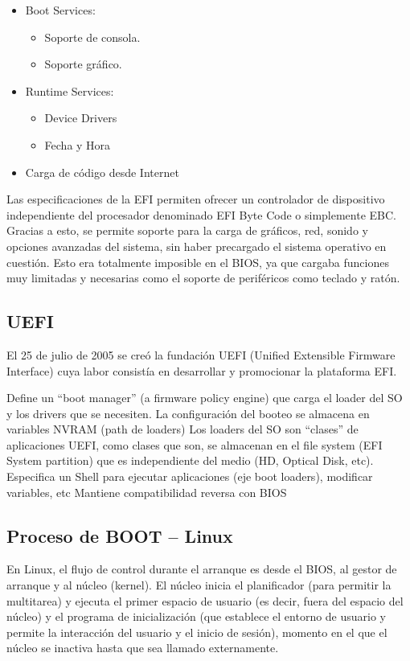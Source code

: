\documentclass[a4paper, twoside]{article}
\begin{document}
\begin{itemize}
	\item Boot Services:
	\begin{itemize}
		\item Soporte de consola.
		\item Soporte gráfico.
	\end{itemize}
	\item Runtime Services:
	\begin{itemize}
		\item Device Drivers
		\item Fecha y Hora
	\end{itemize}
	\item Carga de código desde Internet
\end{itemize}

Las especificaciones de la EFI permiten ofrecer un controlador de dispositivo independiente del procesador denominado EFI Byte Code o simplemente EBC. Gracias a esto, se permite soporte para la carga de gráficos, red, sonido y opciones avanzadas del sistema, sin haber precargado el sistema operativo en cuestión. Esto era totalmente imposible en el BIOS, ya que cargaba funciones muy limitadas y necesarias como el soporte de periféricos como teclado y ratón.

\subsection{UEFI}
El 25 de julio de 2005 se creó la fundación UEFI (Unified Extensible Firmware Interface) cuya labor consistía en desarrollar y promocionar la plataforma EFI.

Define un “boot manager” (a firmware policy engine) que carga el loader del SO y los drivers que se necesiten.
La configuración del booteo se almacena en variables NVRAM (path de loaders)
Los loaders del SO son “clases” de aplicaciones UEFI, como clases que son, se almacenan en el file system (EFI System partition) que es independiente del medio (HD, Optical Disk, etc).
Especifica un Shell para ejecutar aplicaciones (eje boot loaders), modificar variables, etc
Mantiene compatibilidad reversa con BIOS

\subsection{Proceso de BOOT – Linux}
En Linux, el flujo de control durante el arranque es desde el BIOS, al gestor de arranque y al núcleo (kernel). 
El núcleo inicia el planificador (para permitir la multitarea) y ejecuta el primer espacio de usuario (es decir, fuera del espacio del núcleo) y el programa de inicialización (que establece el entorno de usuario y permite la interacción del usuario y el inicio de sesión), momento en el que el núcleo se inactiva hasta que sea llamado externamente.
\end{document}
